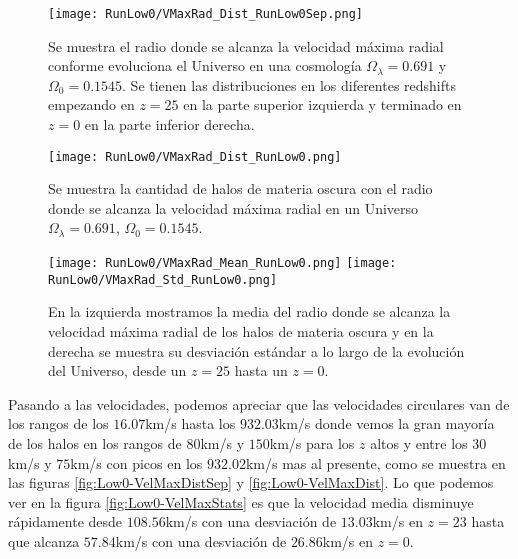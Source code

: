 \begin{figure}[H]
    \centering
    \texttt{[image: RunLow0/VMaxRad\_Dist\_RunLow0Sep.png]}
    \caption[Radio donde se alcanza la velocidad máxima radial en la evolución de un Universo $\Omega_\lambda = 0.691$, $\Omega_0 = 0.1545$]{\footnotesize Se muestra el radio donde se alcanza la velocidad máxima radial conforme evoluciona el Universo en una cosmología $\Omega_\lambda = 0.691$ y $\Omega_0 = 0.1545$. Se tienen las distribuciones en los diferentes redshifts empezando en $z=25$ en la parte superior izquierda y terminado en $z=0$ en la parte inferior derecha.}
    \label{fig:Low0-VMaxRadDistSep}
\end{figure}

\begin{figure}[H]
    \centering
    \texttt{[image: RunLow0/VMaxRad\_Dist\_RunLow0.png]}
    \caption[Distribución del radio donde se alcanza la velocidad máxima radial de un Universo $\Omega_\lambda = 0.691$, $\Omega_0 = 0.1545$]{\footnotesize Se muestra la cantidad de halos de materia oscura con el radio donde se alcanza la velocidad máxima radial en un Universo $\Omega_\lambda = 0.691$, $\Omega_0 = 0.1545$.}
    \label{fig:Low0-VMaxRadDist}
\end{figure}

\begin{figure}[H]
    \centering
    \texttt{[image: RunLow0/VMaxRad\_Mean\_RunLow0.png]}
    \texttt{[image: RunLow0/VMaxRad\_Std\_RunLow0.png]}
    \caption[Media y desviación estándar del Radio donde se alcanza la velocidad máxima radial de un Universo $\Omega_\lambda = 0.691$, $\Omega_0 = 0.1545$]{\footnotesize En la izquierda mostramos la media del radio donde se alcanza la velocidad máxima radial de los halos de materia oscura y en la derecha se muestra su desviación estándar a lo largo de la evolución del Universo, desde un $z=25$ hasta un $z=0$.}
    \label{fig:Low0-VMaxRadStats}
\end{figure}

Pasando a las velocidades, podemos apreciar que las velocidades circulares van de los rangos de los $16.07$km/s hasta los $932.03$km/s donde vemos la gran mayoría de los halos en los rangos de $80$km/s y $150$km/s para los $z$ altos y entre los $30$km/s y $75$km/s con picos en los $932.02$km/s mas al presente, como se muestra en las figuras \ref{fig:Low0-VelMaxDistSep} y \ref{fig:Low0-VelMaxDist}. Lo que podemos ver en la figura \ref{fig:Low0-VelMaxStats} es que la velocidad media disminuye rápidamente desde $108.56$km/s con una desviación de $13.03$km/s en $z=23$ hasta que alcanza $57.84$km/s con una desviación de $26.86$km/s en $z=0$.

